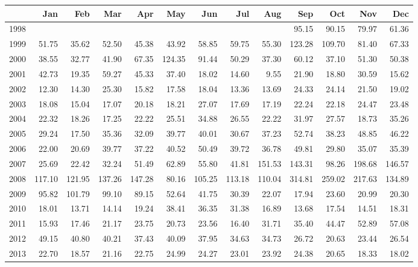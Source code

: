 \begin{longtable}{rrrrrrrrrrrrr}
  \hline
 & Jan & Feb & Mar & Apr & May & Jun & Jul & Aug & Sep & Oct & Nov & Dec \\ 
  \hline
1998 &  &  &  &  &  &  &  &  & 95.15 & 90.15 & 79.97 & 61.36 \\ 
  1999 & 51.75 & 35.62 & 52.50 & 45.38 & 43.92 & 58.85 & 59.75 & 55.30 & 123.28 & 109.70 & 81.40 & 67.33 \\ 
  2000 & 38.55 & 32.77 & 41.90 & 67.35 & 124.35 & 91.44 & 50.29 & 37.30 & 60.12 & 37.10 & 51.30 & 50.38 \\ 
  2001 & 42.73 & 19.35 & 59.27 & 45.33 & 37.40 & 18.02 & 14.60 & 9.55 & 21.90 & 18.80 & 30.59 & 15.62 \\ 
  2002 & 12.30 & 14.30 & 25.30 & 15.82 & 17.58 & 18.04 & 13.36 & 13.69 & 24.33 & 24.14 & 21.50 & 19.02 \\ 
  2003 & 18.08 & 15.04 & 17.07 & 20.18 & 18.21 & 27.07 & 17.69 & 17.19 & 22.24 & 22.18 & 24.47 & 23.48 \\ 
  2004 & 22.32 & 18.26 & 17.25 & 22.22 & 25.51 & 34.88 & 26.55 & 22.22 & 31.97 & 27.57 & 18.73 & 35.26 \\ 
  2005 & 29.24 & 17.50 & 35.36 & 32.09 & 39.77 & 40.01 & 30.67 & 37.23 & 52.74 & 38.23 & 48.85 & 46.22 \\ 
  2006 & 22.00 & 20.69 & 39.77 & 37.22 & 40.52 & 50.49 & 39.72 & 36.78 & 49.81 & 29.80 & 35.07 & 35.39 \\ 
  2007 & 25.69 & 22.42 & 32.24 & 51.49 & 62.89 & 55.80 & 41.81 & 151.53 & 143.31 & 98.26 & 198.68 & 146.57 \\ 
  2008 & 117.10 & 121.95 & 137.26 & 147.28 & 80.16 & 105.25 & 113.18 & 110.04 & 314.81 & 259.02 & 217.63 & 134.89 \\ 
  2009 & 95.82 & 101.79 & 99.10 & 89.15 & 52.64 & 41.75 & 30.39 & 22.07 & 17.94 & 23.60 & 20.99 & 20.30 \\ 
  2010 & 18.01 & 13.71 & 14.14 & 19.24 & 38.41 & 36.35 & 31.38 & 16.89 & 13.68 & 17.54 & 14.51 & 18.31 \\ 
  2011 & 15.93 & 17.46 & 21.17 & 23.75 & 20.73 & 23.56 & 16.40 & 31.71 & 35.40 & 44.47 & 52.89 & 57.08 \\ 
  2012 & 49.15 & 40.80 & 40.21 & 37.43 & 40.09 & 37.95 & 34.63 & 34.73 & 26.72 & 20.63 & 23.44 & 26.54 \\ 
  2013 & 22.70 & 18.57 & 21.16 & 22.75 & 24.99 & 24.27 & 23.01 & 23.92 & 24.38 & 20.65 & 18.33 & 18.02 \\ 

\end{longtable}
